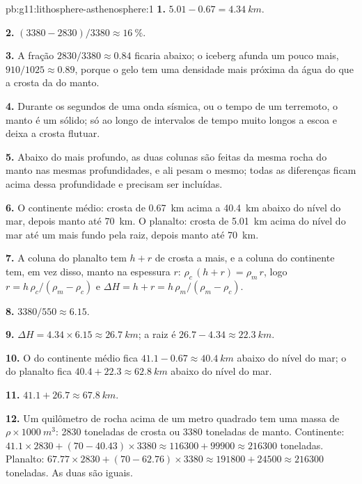 \begin{solution}{pb:g11:lithosphere-asthenosphere:1}
\textbf{1.} $5.01 - 0.67 = \qty{4.34}{km}$.

\textbf{2.} $(3380 - 2830)/3380 \approx \qty{16}{\percent}$.

\textbf{3.} A fração $2830/3380 \approx 0.84$ ficaria abaixo; o iceberg
afunda um pouco mais, $910/1025 \approx 0.89$, porque o gelo tem uma
densidade mais próxima da água do que a crosta da do manto.

\textbf{4.} Durante os segundos de uma onda sísmica, ou o tempo de um
terremoto, o manto é um sólido; só ao longo de intervalos de tempo muito
longos a  escoa e deixa a crosta flutuar.

\textbf{5.} Abaixo do  mais profundo, as duas colunas são feitas da
mesma rocha do manto nas mesmas profundidades, e ali pesam o mesmo; todas as
diferenças ficam acima dessa profundidade e precisam ser incluídas.

\textbf{6.} O continente médio: crosta de \qty{0.67}{km} acima a
\qty{40.4}{km} abaixo do nível do mar, depois manto até \qty{70}{km}. O
planalto: crosta de \qty{5.01}{km} acima do nível do mar até um  mais
fundo pela raiz, depois manto até \qty{70}{km}.

\textbf{7.} A coluna do planalto tem $h + r$ de crosta a mais, e a coluna
do continente tem, em vez disso, manto na espessura $r$: $\rho_c\,(h + r) = \rho_m\,r$,
logo $r = h\,\rho_c/(\rho_m - \rho_c)$ e $\Delta H = h + r =
h\,\rho_m/(\rho_m - \rho_c)$.

\textbf{8.} $3380/550 \approx 6.15$.

\textbf{9.} $\Delta H = 4.34 \times 6.15 \approx \qty{26.7}{km}$; a raiz é
$26.7 - 4.34 \approx \qty{22.3}{km}$.

\textbf{10.} O  do continente médio fica $41.1 - 0.67 \approx
\qty{40.4}{km}$ abaixo do nível do mar; o do planalto fica $40.4 + 22.3 \approx
\qty{62.8}{km}$ abaixo do nível do mar.

\textbf{11.} $41.1 + 26.7 \approx \qty{67.8}{km}$.

\textbf{12.} Um quilômetro de rocha acima de um metro quadrado tem uma massa
de $\rho \times \qty{1000}{m^3}$: \num{2830} toneladas de crosta ou
\num{3380} toneladas de manto. Continente: $41.1 \times 2830 + (70 - 40.43) \times 3380
\approx \num{116300} + \num{99900} \approx \num{216300}$ toneladas. Planalto:
$67.77 \times 2830 + (70 - 62.76) \times 3380 \approx \num{191800} +
\num{24500} \approx \num{216300}$ toneladas. As duas são iguais.


\end{solution}
